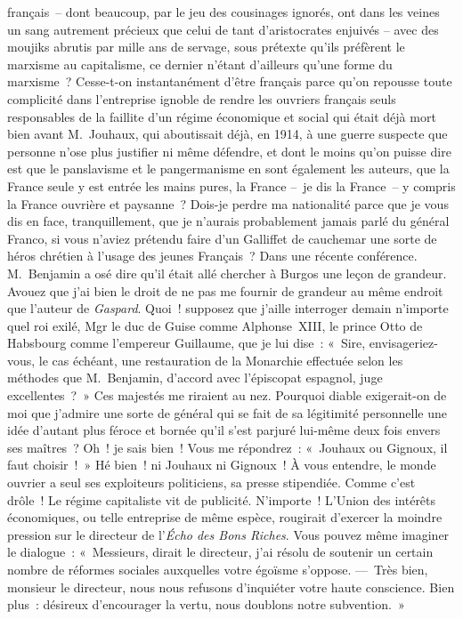 \documentclass[french,twoside]{book} %
\begin{document}
français – dont beaucoup, par le jeu des cousinages ignorés, ont dans les veines un sang autrement précieux que celui de tant d’aristocrates enjuivés – avec des moujiks abrutis par mille ans de servage, sous prétexte qu’ils préfèrent le marxisme au capitalisme, ce dernier n’étant d’ailleurs qu’une forme du marxisme ? Cesse-t-on instantanément d’être français parce qu’on repousse toute complicité dans l’entreprise ignoble de rendre les ouvriers français seuls responsables de la faillite d’un régime économique et social qui était déjà mort bien avant M. Jouhaux, qui aboutissait déjà, en 1914, à une guerre suspecte que personne n’ose plus justifier ni même défendre, et dont le moins qu’on puisse dire est que le panslavisme et le pangermanisme en sont également les auteurs, que la France seule y est entrée les mains pures, la France – je dis la France – y compris la France ouvrière et paysanne ? Dois-je perdre ma nationalité parce que je vous dis en face, tranquillement, que je n’aurais probablement jamais parlé du général Franco, si vous n’aviez prétendu faire d’un Galliffet de cauchemar une sorte de héros chrétien à l’usage des jeunes Français ? Dans une récente conférence. M. Benjamin a osé dire qu’il était allé chercher à Burgos une leçon de grandeur. Avouez que j’ai bien le droit de ne pas me fournir de grandeur au même endroit que l’auteur de \emph{Gaspard}. Quoi ! supposez que j’aille interroger demain n’importe quel roi exilé, Mgr le duc de Guise comme Alphonse \textsc{XIII}, le prince Otto de Habsbourg comme l’empereur Guillaume, que je lui dise : « Sire, envisageriez-vous, le cas échéant, une restauration de la Monarchie effectuée selon les méthodes que M. Benjamin, d’accord avec l’épiscopat espagnol, juge excellentes ? » Ces majestés me riraient au nez. Pourquoi diable exigerait-on de moi que j’admire une sorte de général qui se fait de sa légitimité personnelle une idée d’autant plus féroce et bornée qu’il s’est parjuré lui-même deux fois envers ses maîtres ? Oh ! je sais bien ! Vous me répondrez : « Jouhaux ou Gignoux, il faut choisir ! » Hé bien ! ni Jouhaux ni Gignoux ! À vous entendre, le monde ouvrier a seul ses exploiteurs politiciens, sa presse stipendiée. Comme c’est drôle ! Le régime capitaliste vit de publicité. N’importe ! L’Union des intérêts économiques, ou telle entreprise de même espèce, rougirait d’exercer la moindre pression sur le directeur de l’\emph{Écho des Bons Riches}. Vous pouvez même imaginer le dialogue : « Messieurs, dirait le directeur, j’ai résolu de soutenir un certain nombre de réformes sociales auxquelles votre égoïsme s’oppose. — Très bien, monsieur le directeur, nous nous refusons d’inquiéter votre haute conscience. Bien plus : désireux d’encourager la vertu, nous doublons notre subvention. »\par
\end{document}
